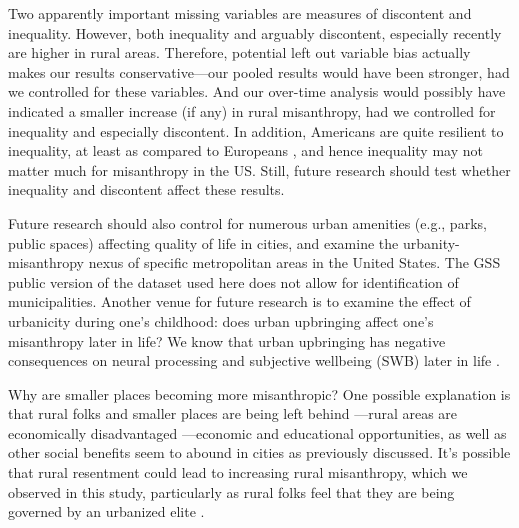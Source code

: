 \documentclass[11pt, letterpaper]{article}
\begin{document}
\begin{spacing}{1.4}
Two apparently important missing variables are measures of discontent and
inequality. However, both inequality \citep[e.g.,][]{daleyMISCNYT20apr14} %
and arguably discontent, especially recently 
\citep[e.g.,][]{case15,hansonCityJournalautumn15,fullerNYT17monD} 
%
 are higher in rural areas. Therefore, potential left out variable bias actually makes our results conservative---our pooled results would have been stronger, had we controlled for these variables. 
 And our over-time analysis would possibly have indicated a smaller increase (if any) in rural misanthropy, had we controlled for inequality and especially discontent.  
 In addition, Americans are quite resilient to inequality, at least as compared to Europeans \citep{alesina04al}, and hence inequality may not matter much for misanthropy in the US.
Still, future research should test whether inequality and discontent affect these results. 

Future research should also control for numerous urban amenities (e.g., parks,
public spaces) affecting quality of life in cities, and examine the
urbanity-misanthropy nexus of specific metropolitan areas in the United
States. The GSS public version of the dataset used here does not allow for
identification of municipalities. Another venue for future research is to examine the effect of urbanicity during one's childhood: does urban upbringing affect one's misanthropy later in life? We know that urban upbringing has negative consequences on neural processing and subjective wellbeing (SWB) later in life \citep{lederbogen11,aok20}. 

Why are smaller places becoming more misanthropic? One possible explanation is that rural folks and smaller places are being left behind \citep{fullerNYT17monD,hansonCityJournalautumn15,aok-misanthropy-trustCity,aok-swbGenYcity18,aokCityBook15}---rural areas are economically disadvantaged \citep{glaeser11,osullivan09,florida21}---economic and educational opportunities, as well as other social benefits seem to abound in cities as previously discussed. It's possible that rural resentment could lead to increasing rural misanthropy, which we observed in this study, particularly as rural folks feel that they are being governed by an urbanized elite \citep{wuthnow18,fullerNYT17monD}. %
  

\end{spacing}
\end{document}
